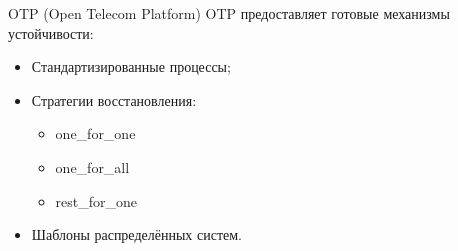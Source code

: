 \begin{frame}{OTP (Open Telecom Platform)}
	OTP предоставляет готовые механизмы устойчивости:
	
	\begin{itemize}
		\item Стандартизированные процессы;
		\item Стратегии восстановления:
		\begin{itemize}
			\item one\_for\_one
			\item one\_for\_all
			\item rest\_for\_one
		\end{itemize}
		\item Шаблоны распределённых систем.
	\end{itemize}
\end{frame}